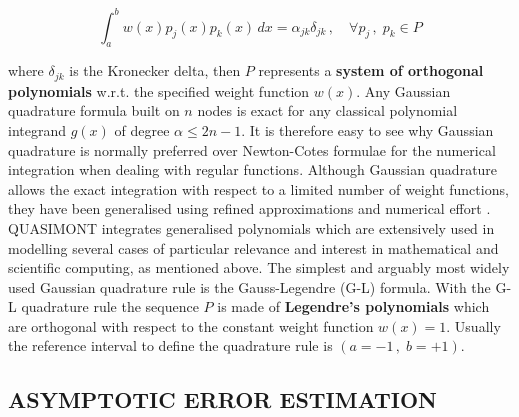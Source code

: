 \documentclass[a4paper, twosided]{book}
\begin{document}
\begin{equation}\label{eq1.6}
    \int_a^b w(x)p_j(x)p_k(x)\,dx = \alpha_{jk}\delta_{jk}\,,\quad\forall p_j\,,\;p_k\in P
\end{equation}

\noindent
where $\delta_{jk}$ is the Kronecker delta, then $P$ represents a \color{poliDarkBlue} \textbf{system of orthogonal polynomials} \color{black} w.r.t. the specified weight function $w(x)$. Any Gaussian quadrature formula built on  $n$ nodes is exact for any classical polynomial integrand $g(x)$ of degree $\alpha\leq 2n-1$. It is therefore easy to see why Gaussian quadrature is normally preferred over Newton-Cotes formulae for the numerical integration when dealing with regular functions. Although Gaussian quadrature allows the exact integration with respect to a limited number of weight functions, they have been generalised using refined approximations and numerical effort \cite{Gautschi94}. QUASIMONT integrates generalised polynomials which are extensively used in modelling several cases of particular relevance and interest in mathematical and scientific computing, as mentioned above. The simplest and arguably most widely used Gaussian quadrature rule is the Gauss-Legendre (G-L) formula. With the G-L quadrature rule the sequence $P$ is made of \color{poliDarkBlue} \textbf{Legendre's polynomials} \color{black} which are orthogonal with respect to the constant weight function $w(x)=1$. Usually the reference interval to define the quadrature rule is $(a=-1\,,\;b=+1)$.

\subsection[Asymptotic error estimation]{\changefont ASYMPTOTIC ERROR ESTIMATION \color{black}}\label{SubSec1.2.3}
\end{document}
